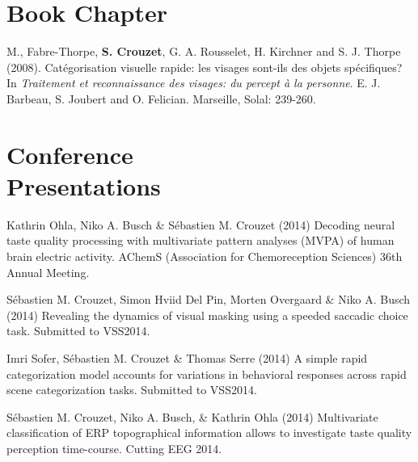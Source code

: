 \documentclass[margin,line]{resume}
\begin{document}
\begin{resume}

\newpage

	\vspace{3mm}	
    \section{\mysidestyle Book Chapter}

M., Fabre-Thorpe, \textbf{S. Crouzet}, G. A. Rousselet, H. Kirchner and S. J. Thorpe (2008). Catégorisation visuelle rapide: les visages sont-ils des objets spécifiques? In \textsl{Traitement et reconnaissance des visages: du percept à la personne}. E. J. Barbeau, S. Joubert and O. Felician. Marseille, Solal: 239-260.

	\vspace{3mm}	
    \section{\mysidestyle Conference\\Presentations}

\footnotesize %

Kathrin Ohla, Niko A. Busch \& Sébastien M. Crouzet (2014) Decoding neural taste quality processing with multivariate pattern analyses (MVPA) of human brain electric activity. AChemS (Association for Chemoreception Sciences) 36th Annual Meeting.

\vspace{-2mm} Sébastien M. Crouzet, Simon Hviid Del Pin, Morten Overgaard \& Niko A. Busch (2014) Revealing the dynamics of visual masking using a speeded saccadic choice task. Submitted to VSS2014.

\vspace{-2mm} Imri Sofer, Sébastien M. Crouzet \& Thomas Serre (2014) A simple rapid categorization model accounts for variations in behavioral responses across rapid scene categorization tasks. Submitted to VSS2014.

\vspace{-2mm} Sébastien M. Crouzet, Niko A. Busch, \& Kathrin Ohla (2014) Multivariate classification of ERP topographical information allows to investigate taste quality perception time-course. Cutting EEG 2014.


\end{resume}
\end{document}
